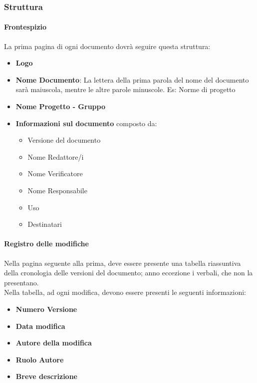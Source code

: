 \documentclass[11pt,a4paper]{article}
\begin{document}
{	\subsubsection{Struttura}
	
	\paragraph{Frontespizio} 
	La prima pagina di ogni documento dovrà seguire questa struttura:
	\begin{itemize}
		\item \textbf{Logo}
		\item \textbf{Nome Documento}: La lettera della prima parola del nome del documento sarà maiuscola, mentre le altre parole minuscole. Es: Norme di progetto
		\item \textbf{Nome Progetto - Gruppo}
		\item \textbf{Informazioni sul documento} composto da:
		\begin{itemize}
			\item  Versione del documento 
			\item Nome Redattore/i
			\item Nome Verificatore
			\item  Nome Responsabile
			\item  Uso
			\item Destinatari
		\end{itemize}
	\end{itemize}
	
	\paragraph{Registro delle modifiche\\}
	Nella pagina seguente alla prima, deve essere presente una tabella riassuntiva della cronologia delle versioni del documento; anno eccezione i verbali, che non la presentano. \\
	Nella tabella, ad ogni modifica, devono essere presenti le seguenti informazioni:
	
	\begin{itemize}
		\item \textbf{Numero Versione}
		\item \textbf{Data modifica}
		\item \textbf{Autore della modifica}
		\item \textbf{Ruolo Autore}
		\item \textbf{Breve descrizione}
	\end{itemize}
	
}
\end{document}
